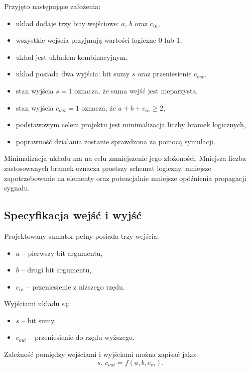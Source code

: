 \documentclass[12pt,a4paper]{article}
\begin{document}
Przyjęto następujące założenia:
\begin{itemize}
    \item układ dodaje trzy bity wejściowe: $a$, $b$ oraz $c_{in}$,
    \item wszystkie wejścia przyjmują wartości logiczne 0 lub 1,
    \item układ jest układem kombinacyjnym,
    \item układ posiada dwa wyjścia: bit sumy $s$ oraz przeniesienie $c_{out}$,
    \item stan wyjścia $s = 1$ oznacza, że suma wejść jest nieparzysta,
    \item stan wyjścia $c_{out} = 1$ oznacza, że $a + b + c_{in} \geq 2$,
    \item podstawowym celem projektu jest minimalizacja liczby bramek logicznych,
    \item poprawność działania zostanie sprawdzona za pomocą symulacji.
\end{itemize}

Minimalizacja układu ma na celu zmniejszenie jego złożoności. Mniejsza liczba zastosowanych bramek oznacza prostszy schemat logiczny, mniejsze zapotrzebowanie na elementy oraz potencjalnie mniejsze opóźnienia propagacji sygnału.

\subsection{Specyfikacja wejść i wyjść}

Projektowany sumator pełny posiada trzy wejścia:
\begin{itemize}
    \item $a$ -- pierwszy bit argumentu,
    \item $b$ -- drugi bit argumentu,
    \item $c_{in}$ -- przeniesienie z niższego rzędu.
\end{itemize}

Wyjściami układu są:
\begin{itemize}
    \item $s$ -- bit sumy,
    \item $c_{out}$ -- przeniesienie do rzędu wyższego.
\end{itemize}

Zależność pomiędzy wejściami i wyjściami można zapisać jako:
\begin{equation*}
s, \, c_{out} = f(a, b, c_{in}).
\end{equation*}
\end{document}
